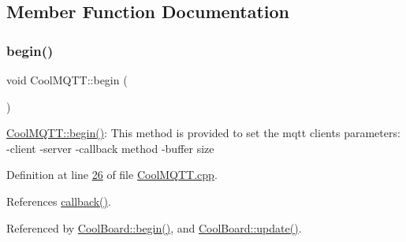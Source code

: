 \subsection{Member Function Documentation}
\mbox{\label{class_cool_m_q_t_t_ac9248808641ebf3054ed0620ea9d0100}} 
\subsubsection{\texorpdfstring{begin()}{begin()}}
{\footnotesize\ttfamily void Cool\+M\+Q\+T\+T\+::begin (\begin{DoxyParamCaption}{ }\end{DoxyParamCaption})}

\hyperlink{class_cool_m_q_t_t_ac9248808641ebf3054ed0620ea9d0100}{Cool\+M\+Q\+T\+T\+::begin()}\+: This method is provided to set the mqtt client\textquotesingle{}s parameters\+: -\/client -\/server -\/callback method -\/buffer size 

Definition at line \hyperlink{_cool_m_q_t_t_8cpp_source_l00026}{26} of file \hyperlink{_cool_m_q_t_t_8cpp_source}{Cool\+M\+Q\+T\+T.\+cpp}.



References \hyperlink{_cool_m_q_t_t_8cpp_source_l00160}{callback()}.



Referenced by \hyperlink{_cool_board_8cpp_source_l00021}{Cool\+Board\+::begin()}, and \hyperlink{_cool_board_8cpp_source_l00411}{Cool\+Board\+::update()}.


